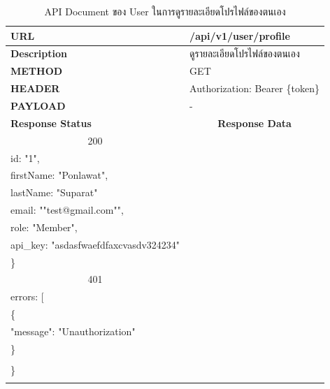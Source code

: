 \documentclass[12pt,oneside,openright,a4paper]{cpe-thai-project}
\begin{document}
\begin{longtable}[!ht]{p{3cm}|p{8cm}}
  \caption{API Document ของ User ในการดูรายละเอียดโปรไฟล์ของตนเอง}\label{tbl:api_user_profile} 
    \endfirsthead
    \endhead
    \hhline{==}
    \textbf{URL}              & /api/v1/user/profile                                                                                               \\ \hline
    \textbf{Description}      & ดูรายละเอียดโปรไฟล์ของตนเอง                                                                                            \\ \hline
    \textbf{METHOD}           & GET                                                                                                                 \\ \hline
    \textbf{HEADER}           & Authorization: Bearer \{token\}                                                                                       \\ \hline 
    \textbf{PAYLOAD}          & -                                                                                                                   \\ \hline \newpage \hline 
    \textbf{Response Status}  & \multicolumn{1}{c}{\textbf{Response Data}}                                                                          \\ \hline
    \multicolumn{1}{c|}{200}  & \begin{tabular}[c]{@{}l@{}}\{\\ \quad id: "1",\\ \quad firstName: "Ponlawat",\\ \quad lastName: "Suparat" \\
      \quad email: ""test@gmail.com"",\\ \quad role: "Member",\\ \quad api\_key: "asdasfwaefdfaxcvasdv324234"\\\}\end{tabular}           \\ \hline
    \multicolumn{1}{c|}{401}  &
    \begin{tabular}[c]{@{}l@{}}\{\\ \quad errors: {[}\\ \quad\quad\{\\ \quad\quad\quad "message": "Unauthorization"\\ \quad\quad \}\\ \quad{]}\\\}\end{tabular}                                                                         \\ \hline
    \hhline{==}
\end{longtable}
\end{document}
